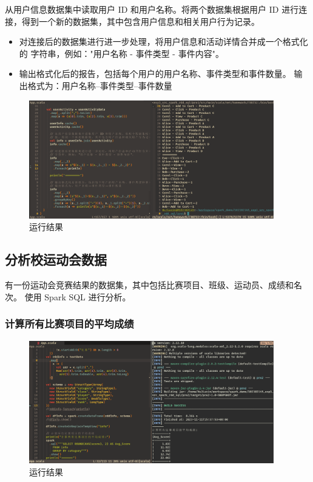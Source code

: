 \documentclass{article}
\begin{document}
从用户信息数据集中读取用户 ID 和用户名称。将两个数据集根据用户 ID 进行连
接，得到一个新的数据集，其中包含用户信息和相关用户行为记录。

\begin{itemize}
  \item 对连接后的数据集进行进一步处理，将用户信息和活动详情合并成一个格式化的
    字符串，例如："用户名称 - 事件类型 - 事件内容"。
  \item 输出格式化后的报告，包括每个用户的用户名称、事件类型和事件数量。
    输出格式为：用户名称--事件类型--事件数量
\end{itemize}

\begin{figure}[H]
  \begin{center}
    \includegraphics[width=0.95\textwidth]{./figures/1-3.png}
  \end{center}
  \caption{运行结果}
\end{figure}

\subsection{分析校运动会数据}

有一份运动会竞赛结果的数据集，其中包括比赛项目、班级、运动员、成绩和名次。
使用 Spark SQL 进行分析。

\subsubsection{计算所有比赛项目的平均成绩}
\begin{figure}[H]
  \begin{center}
    \includegraphics[width=0.95\textwidth]{./figures/2-1.png}
  \end{center}
  \caption{运行结果}
\end{figure}
\end{document}
